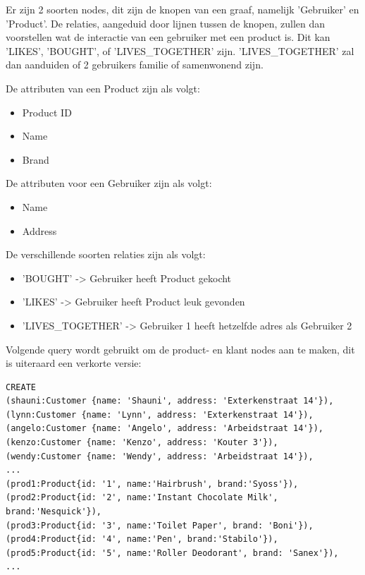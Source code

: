 Er zijn 2 soorten nodes, dit zijn de knopen van een graaf, namelijk 'Gebruiker' en 'Product'. De relaties, aangeduid door lijnen tussen de knopen, zullen dan voorstellen wat de interactie van een gebruiker met een product is. Dit kan 'LIKES', 'BOUGHT', of 'LIVES\_TOGETHER' zijn. 'LIVES\_TOGETHER' zal dan aanduiden of 2 gebruikers familie of samenwonend zijn. 

De attributen van een Product zijn als volgt:
\begin{itemize}
	\item Product ID
	\item Name
	\item Brand
\end{itemize}

De attributen voor een Gebruiker zijn als volgt:
\begin{itemize}
	\item Name
	\item Address
\end{itemize}

De verschillende soorten relaties zijn als volgt:
\begin{itemize}
	\item 'BOUGHT' -> Gebruiker heeft Product gekocht
	\item 'LIKES' -> Gebruiker heeft Product leuk gevonden
	\item 'LIVES\_TOGETHER' -> Gebruiker 1 heeft hetzelfde adres als Gebruiker 2
\end{itemize}

Volgende query wordt gebruikt om de product- en klant nodes aan te maken, dit is uiteraard een verkorte versie:

\begin{lstlisting}[caption={Neo4j query voor het aanmaken van producten en klanten}]
CREATE 
(shauni:Customer {name: 'Shauni', address: 'Exterkenstraat 14'}),
(lynn:Customer {name: 'Lynn', address: 'Exterkenstraat 14'}),
(angelo:Customer {name: 'Angelo', address: 'Arbeidstraat 14'}), 
(kenzo:Customer {name: 'Kenzo', address: 'Kouter 3'}), 
(wendy:Customer {name: 'Wendy', address: 'Arbeidstraat 14'}), 
...
(prod1:Product{id: '1', name:'Hairbrush', brand:'Syoss'}), 
(prod2:Product{id: '2', name:'Instant Chocolate Milk', brand:'Nesquick'}), 
(prod3:Product{id: '3', name:'Toilet Paper', brand: 'Boni'}), 
(prod4:Product{id: '4', name:'Pen', brand:'Stabilo'}), 
(prod5:Product{id: '5', name:'Roller Deodorant', brand: 'Sanex'}), 
...
\end{lstlisting}

